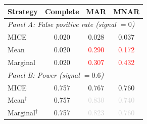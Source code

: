 \begin{tabular}{lccc}
    \toprule
    Strategy & Complete & MAR & MNAR \\
    \midrule
    \multicolumn{4}{l}{\textit{Panel A: False positive rate (signal $= 0$)}} \\
    MICE      & 0.020 & 0.028 & 0.037 \\
    Mean      & 0.020 & \textcolor{red}{0.290} & \textcolor{red}{0.172} \\
    Marginal  & 0.020 & \textcolor{red}{0.307} & \textcolor{red}{0.432} \\
    \midrule
    \multicolumn{4}{l}{\textit{Panel B: Power (signal $= 0.6$)}} \\
    MICE      & 0.757 & 0.767 & 0.760 \\
    Mean$^\dagger$ & 0.757 & \textcolor{lightgray}{0.830} & \textcolor{lightgray}{0.740} \\
    Marginal$^\dagger$ & 0.757 & \textcolor{lightgray}{0.823} & \textcolor{lightgray}{0.760} \\
    \bottomrule
\end{tabular}
